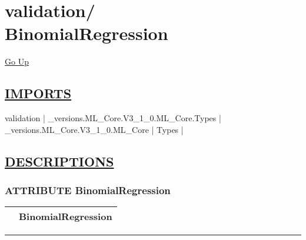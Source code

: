\chapter*{\color{headfile}
{\large validation\slash\hspace{0pt}}
 \\
BinomialRegression
}
\hypertarget{ecldoc:toc:validation.BinomialRegression}{}
\hyperlink{ecldoc:toc:root/validation}{Go Up}

\section*{\underline{\textsf{IMPORTS}}}
\begin{doublespace}
{\large
validation |
\_versions.ML\_Core.V3\_1\_0.ML\_Core.Types |
\_versions.ML\_Core.V3\_1\_0.ML\_Core |
Types |
}
\end{doublespace}

\section*{\underline{\textsf{DESCRIPTIONS}}}
\subsection*{\textsf{\colorbox{headtoc}{\color{white} ATTRIBUTE}
BinomialRegression}}

\hypertarget{ecldoc:validation.binomialregression}{}

{\renewcommand{\arraystretch}{1.5}
\begin{tabularx}{\textwidth}{|>{\raggedright\arraybackslash}l|X|}
\hline
\hspace{0pt}\mytexttt{\color{red} } & \textbf{BinomialRegression} \\
\hline
\end{tabularx}
}

\par


\rule{\linewidth}{0.5pt}
